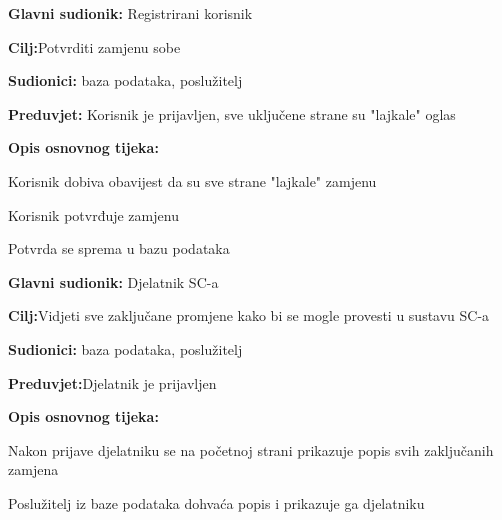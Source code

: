 \noindent {}
\begin{packed_item}

	\item \textbf{Glavni sudionik: }Registrirani korisnik
	\item  \textbf{Cilj:}Potvrditi zamjenu sobe
	\item  \textbf{Sudionici:} baza podataka, poslužitelj
	\item  \textbf{Preduvjet:} Korisnik je prijavljen, sve uključene strane su "lajkale" oglas
	\item  \textbf{Opis osnovnog tijeka:}

	\item[] \begin{packed_enum}

				\item Korisnik dobiva obavijest da su sve strane "lajkale" zamjenu
				\item Korisnik potvrđuje zamjenu
				\item Potvrda se sprema u bazu podataka

	\end{packed_enum}
\end{packed_item}
\noindent {}
\begin{packed_item}

	\item \textbf{Glavni sudionik: }Djelatnik SC-a
	\item  \textbf{Cilj:}Vidjeti sve zaključane promjene kako bi se mogle provesti u sustavu SC-a
	\item  \textbf{Sudionici:} baza podataka, poslužitelj
	\item  \textbf{Preduvjet:}Djelatnik je prijavljen
	\item  \textbf{Opis osnovnog tijeka:}

	\item[] \begin{packed_enum}

				\item Nakon prijave djelatniku se na početnoj strani prikazuje popis svih zaključanih zamjena
				\item Poslužitelj iz baze podataka dohvaća popis i prikazuje ga djelatniku


	\end{packed_enum}

\end{packed_item}






			 
			 
			 
	
